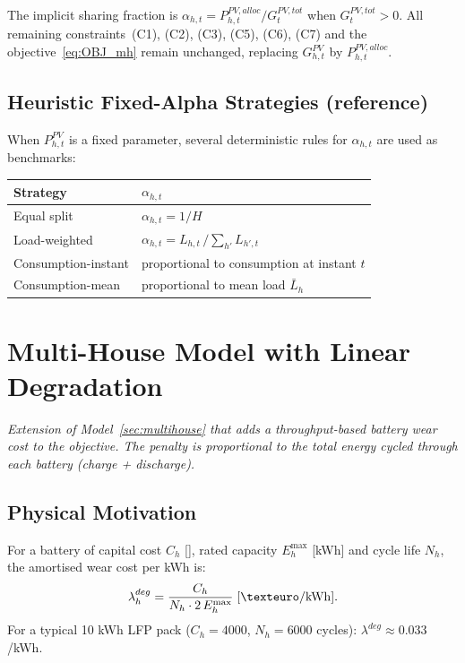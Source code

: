 \documentclass{article}
\begin{document}
The implicit sharing fraction is
$\alpha_{h,t} = P^{PV,alloc}_{h,t} / G^{PV,tot}_t$ when $G^{PV,tot}_t > 0$.
All remaining constraints~(C1), (C2), (C3), (C5), (C6), (C7) and the
objective~\eqref{eq:OBJ_mh} remain unchanged, replacing $G^{PV}_{h,t}$ by
$P^{PV,alloc}_{h,t}$.

\subsection{Heuristic Fixed-Alpha Strategies (reference)}

When $P^{PV}_{h,t}$ is a fixed parameter, several deterministic rules for
$\alpha_{h,t}$ are used as benchmarks:

\begin{center}
\begin{tabular}{ll}
\toprule
Strategy & $\alpha_{h,t}$ \\
\midrule
Equal split          & $\alpha_{h,t} = 1/H$ \\
Load-weighted        & $\alpha_{h,t} = L_{h,t}\,/\!\sum_{h'} L_{h',t}$ \\
Consumption-instant  & proportional to consumption at instant $t$ \\
Consumption-mean     & proportional to mean load $\bar{L}_h$ \\
\bottomrule
\end{tabular}
\end{center}

\newpage
\section{Multi-House Model with Linear Degradation}
\label{sec:deg_linear}

\textit{Extension of Model~\ref{sec:multihouse} that adds a throughput-based
battery wear cost to the objective. The penalty is proportional to the total
energy cycled through each battery (charge + discharge).}

\subsection{Physical Motivation}

For a battery of capital cost $C_h$ [\texteuro], rated capacity $E^{\max}_h$
[kWh] and cycle life $N_h$, the amortised wear cost per kWh is:
\[
  \lambda^{deg}_h
  = \frac{C_h}{N_h \cdot 2\,E^{\max}_h}
  \;[\texteuro/\mathrm{kWh}].
\]
For a typical 10 kWh LFP pack ($C_h = 4000$\;\texteuro, $N_h = 6000$
cycles): $\lambda^{deg} \approx 0.033$\;\texteuro/kWh.
\end{document}
